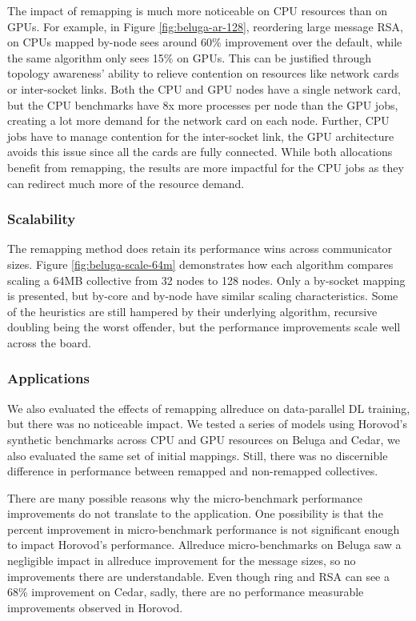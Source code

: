 The impact of remapping is much more noticeable on \gls{CPU} resources than on \gls{GPU}s.
For example, in Figure \ref{fig:beluga-ar-128}, reordering large message \gls{RSA}, on \gls{CPU}s mapped by-node sees around 60\% improvement over the default, while the same algorithm only sees 15\% on \gls{GPU}s.
This can be justified through topology awareness' ability to relieve contention on resources like network cards or inter-socket links. 
Both the \gls{CPU} and \gls{GPU} nodes have a single network card, but the \gls{CPU} benchmarks have 8x more processes per node than the \gls{GPU} jobs, creating a lot more demand for the network card on each node.
Further, \gls{CPU} jobs have to manage contention for the inter-socket link, the \gls{GPU} architecture avoids this issue since all the cards are fully connected.
While both allocations benefit from remapping, the results are more impactful for the \gls{CPU} jobs as they can redirect much more of the resource demand.

\subsubsection{Scalability}



The remapping method does retain its performance wins across communicator sizes. 
Figure \ref{fig:beluga-scale-64m} demonstrates how each algorithm compares scaling a 64MB collective from 32 nodes to 128 nodes.
Only a by-socket mapping is presented, but by-core and by-node have similar scaling characteristics.
Some of the heuristics are still hampered by their underlying algorithm, recursive doubling being the worst offender, but the performance improvements scale well across the board.

\subsubsection{Applications}
We also evaluated the effects of remapping allreduce on data-parallel \gls{DL} training, but there was no noticeable impact.
We tested a series of models using Horovod's synthetic benchmarks across \gls{CPU} and \gls{GPU} resources on Beluga and Cedar, we also evaluated the same set of initial mappings. 
Still, there was no discernible difference in performance between remapped and non-remapped collectives.

There are many possible reasons why the micro-benchmark performance improvements do not translate to the application.
One possibility is that the percent improvement in micro-benchmark performance is not significant enough to impact Horovod's performance.
Allreduce micro-benchmarks on Beluga saw a negligible impact in allreduce improvement for the message sizes, so no improvements there are understandable.
Even though ring and \gls{RSA} can see a 68\% improvement on Cedar, sadly, there are no performance measurable improvements observed in Horovod.

